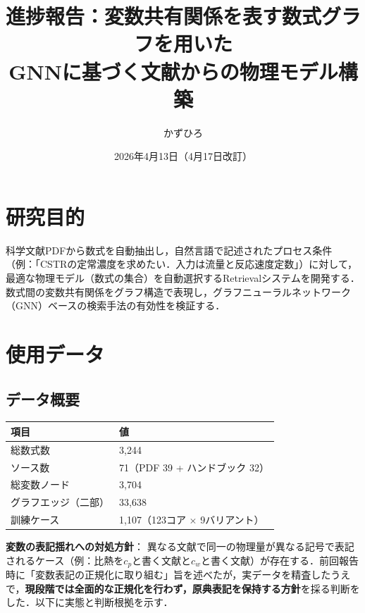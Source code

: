 \documentclass[11pt,a4paper]{ltjsarticle}
\title{{\sffamily 進捗報告：変数共有関係を表す数式グラフを用いた\\GNNに基づく文献からの物理モデル構築}}
\author{かずひろ}
\date{2026年4月13日（4月17日改訂）}
\begin{document}
\maketitle


\section{研究目的}

科学文献PDFから数式を自動抽出し，自然言語で記述されたプロセス条件（例：「CSTRの定常濃度を求めたい．入力は流量と反応速度定数」）に対して，最適な物理モデル（数式の集合）を自動選択するRetrievalシステムを開発する．数式間の変数共有関係をグラフ構造で表現し，グラフニューラルネットワーク（GNN）ベースの検索手法の有効性を検証する．

\section{使用データ}

\subsection{データ概要}

\begin{table}[h]
\centering
\begin{tabular}{ll}
\toprule
項目 & 値 \\
\midrule
総数式数 & 3,244 \\
ソース数 & 71（PDF 39 + ハンドブック 32） \\
総変数ノード & 3,704 \\
グラフエッジ（二部） & 33,638 \\
訓練ケース & 1,107（123コア $\times$ 9バリアント） \\
\bottomrule
\end{tabular}
\end{table}

\textbf{変数の表記揺れへの対処方針}：
異なる文献で同一の物理量が異なる記号で表記されるケース（例：比熱を$c_p$と書く文献と$c_w$と書く文献）が存在する．前回報告時に「変数表記の正規化に取り組む」旨を述べたが，実データを精査したうえで，\textbf{現段階では全面的な正規化を行わず，原典表記を保持する方針}を採る判断をした．以下に実態と判断根拠を示す．
\end{document}
